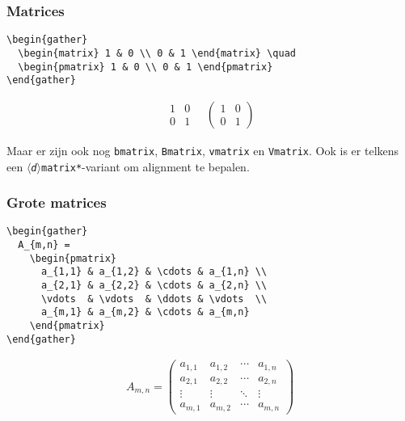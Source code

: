 \begin{frame}[fragile]
  \frametitle{Matrices}

  \begin{verbatim}
\begin{gather}
  \begin{matrix} 1 & 0 \\ 0 & 1 \end{matrix} \quad
  \begin{pmatrix} 1 & 0 \\ 0 & 1 \end{pmatrix}
\end{gather}
  \end{verbatim}
\begin{gather}
  \begin{matrix} 1 & 0 \\ 0 & 1 \end{matrix} \quad
  \begin{pmatrix} 1 & 0 \\ 0 & 1 \end{pmatrix}
\end{gather}

Maar er zijn ook nog \verb|bmatrix|, \verb|Bmatrix|, \verb|vmatrix| en \verb|Vmatrix|. Ook is er telkens een \texttt{\textsl{$\langle$d$\rangle$}matrix*}-variant om alignment te bepalen.
\end{frame}

\begin{frame}[fragile]
  \frametitle{Grote matrices}
  
  \footnotesize
  \begin{verbatim}
\begin{gather}
  A_{m,n} =
    \begin{pmatrix}
      a_{1,1} & a_{1,2} & \cdots & a_{1,n} \\
      a_{2,1} & a_{2,2} & \cdots & a_{2,n} \\
      \vdots  & \vdots  & \ddots & \vdots  \\
      a_{m,1} & a_{m,2} & \cdots & a_{m,n}
    \end{pmatrix} 
\end{gather}
  \end{verbatim}
\begin{gather}
  A_{m,n} =
    \begin{pmatrix}
      a_{1,1} & a_{1,2} & \cdots & a_{1,n} \\
      a_{2,1} & a_{2,2} & \cdots & a_{2,n} \\
      \vdots  & \vdots  & \ddots & \vdots  \\
      a_{m,1} & a_{m,2} & \cdots & a_{m,n}
    \end{pmatrix} 
\end{gather}
\end{frame}

